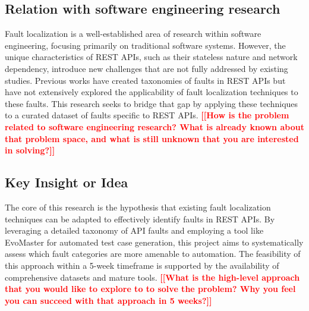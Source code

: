\documentclass[conference]{IEEEtran}
\newcommand{\todo}[1]{\textcolor{red}{{\bfseries [[#1]]}}}
\begin{document}
\subsection{Relation with software engineering research}
    Fault localization is a well-established area of research within software engineering, focusing primarily on traditional software systems. However, the unique characteristics of REST APIs, such as their stateless nature and network dependency, introduce new challenges that are not fully addressed by existing studies. Previous works have created taxonomies of faults in REST APIs but have not extensively explored the applicability of fault localization techniques to these faults. This research seeks to bridge that gap by applying these techniques to a curated dataset of faults specific to REST APIs.
    \todo{How is the problem related to software engineering research? What is already known about that problem space, and what is still unknown that you are interested in solving?}

\subsection{Key Insight or Idea}
    The core of this research is the hypothesis that existing fault localization techniques can be adapted to effectively identify faults in REST APIs. By leveraging a detailed taxonomy of API faults and employing a tool like EvoMaster for automated test case generation, this project aims to systematically assess which fault categories are more amenable to automation. The feasibility of this approach within a 5-week timeframe is supported by the availability of comprehensive datasets and mature tools.
    \todo{What is the high-level approach that you would like to explore to to solve the problem? Why you feel you can succeed with that approach in 5 weeks?}
\end{document}

